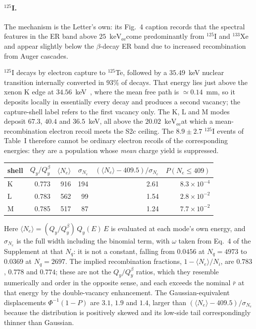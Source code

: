 \documentclass[11pt,a4paper]{article}
\newcommand{\keVee}{\ensuremath{\mathrm{keV_{ee}}}}
\begin{document}
\paragraph{\(^{125}\)I.} The mechanism is the Letter's own: its Fig.~4
caption records that the spectral features in the ER band above
\(25\)~\keVee come predominantly from \(^{125}\)I and
\(^{133}\)Xe and appear slightly below the \(\beta\)-decay ER band due to
increased recombination from Auger cascades.

\(^{125}\)I decays by electron capture to \(^{125}\)Te, followed by a
\(35.49\)~keV nuclear transition internally converted in \(93\%\) of
decays. That energy lies just above the xenon K edge at
\(34.56\)~keV~\cite{XCOM}, where the mean free path is
\(\simeq0.14\)~mm, so it deposits locally in essentially every decay and
produces a second vacancy; the capture-shell label refers to the first
vacancy only. The K, L and M modes deposit \(67.3\), \(40.4\) and
\(36.5\)~keV, all above the \(20.02\)~\keVee at which a
mean-recombination electron recoil meets the S2c ceiling. The
\(8.9\pm2.7\) \(^{125}\)I events of Table~I therefore cannot be ordinary
electron recoils of the corresponding energies: they are a population
whose \emph{mean} charge yield is suppressed.

\begin{center}
\begin{tabular}{lrrrrr}
\toprule
shell & \(Q_y/Q_y^\beta\) & \(\langle N_e\rangle\) & \(\sigma_{N_e}\) &
\((\langle N_e\rangle-409.5)/\sigma_{N_e}\) & \(P(N_e\le409)\)\\
\midrule
K & 0.773 & 916 & 194 & 2.61 & \(8.3\times10^{-4}\)\\
L & 0.783 & 562 &  99 & 1.54 & \(2.8\times10^{-2}\)\\
M & 0.785 & 517 &  87 & 1.24 & \(7.7\times10^{-2}\)\\
\bottomrule
\end{tabular}
\end{center}

\noindent Here
\(\langle N_e\rangle=(Q_y/Q_y^\beta)\,Q_y(E)\,E\) is evaluated at each
mode's own energy, and \(\sigma_{N_e}\) is the full width including the
binomial term, with \(\omega\) taken from Eq.~4 of the Supplement at that
\(N_q\): it is not a constant, falling from \(0.0456\) at \(N_q=4973\) to
\(0.0369\) at \(N_q=2697\). The implied recombination fractions,
\(1-\langle N_e\rangle/N_i\), are \(0.783\), \(0.778\) and \(0.774\);
these are not the \(Q_y/Q_y^\beta\) ratios, which they resemble
numerically and order in the opposite sense, and each exceeds the nominal
\(\bar{r}\) at that energy by the double-vacancy enhancement. The Gaussian-equivalent
displacements \(\Phi^{-1}(1-P)\) are \(3.1\), \(1.9\) and \(1.4\), larger
than \((\langle N_e\rangle-409.5)/\sigma_{N_e}\) because the distribution is
positively skewed and its low-side tail correspondingly thinner than
Gaussian.
\end{document}
